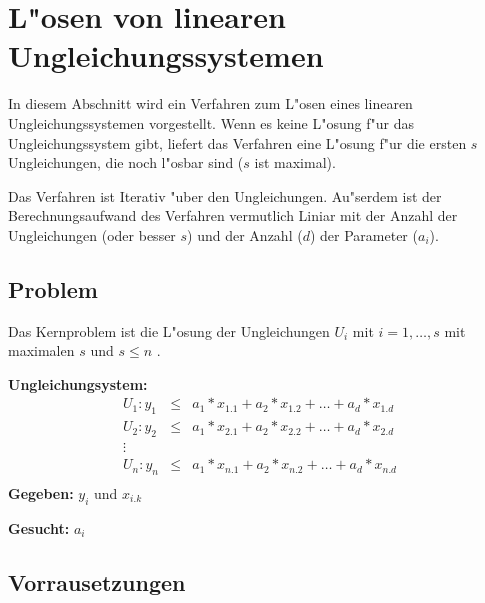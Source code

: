%
%
%
%
%

\section{L"osen von linearen Ungleichungssystemen}
\label{secSolveLinearInequiations}

In diesem Abschnitt wird ein Verfahren zum L"osen eines linearen Ungleichungssystemen vorgestellt. Wenn es keine L"osung f"ur das Ungleichungssystem gibt, liefert das Verfahren eine L"osung f"ur die ersten $s$ Ungleichungen, die noch l"osbar sind ($s$ ist maximal).

Das Verfahren ist Iterativ "uber den Ungleichungen. Au"serdem ist der Berechnungsaufwand des Verfahren vermutlich Liniar mit der Anzahl der Ungleichungen (oder besser $s$) und der Anzahl ($d$) der Parameter ($a_i$).


\subsection{Problem}

Das Kernproblem ist die L"osung der Ungleichungen $U_i$ mit $i = 1, \ldots, s$ mit maximalen $s$ und $s \leq n$ .

\bigskip\noindent
\textbf{Ungleichungsystem:}
\begin{eqnarray*}
U_1: y_1 &\leq&  a_1 * x_{1.1} + a_2 * x_{1.2} + \ldots + a_d * x_{1.d}\\
U_2: y_2 &\leq&  a_1 * x_{2.1} + a_2 * x_{2.2} + \ldots + a_d * x_{2.d}\\
\vdots & & \\
U_n: y_n &\leq&  a_1 * x_{n.1} + a_2 * x_{n.2} + \ldots + a_d * x_{n.d}\\
\end{eqnarray*}
\textbf{Gegeben:} $y_i$ und $x_{i.k}$

\noindent
\textbf{Gesucht:} $a_i$


\subsection{Vorrausetzungen}

